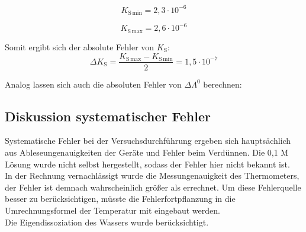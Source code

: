 \documentclass[12pt,a4paper,titlepage,headinclude,bibtotoc]{scrartcl}
\begin{document}
\begin{equation}
K_{\mathrm{S}\,\mathrm{min}} = 2,3 \cdot 10^{-6}
\end{equation}

\begin{equation}
K_{\mathrm{S}\,\mathrm{max}} = 2,6 \cdot 10^{-6}
\end{equation}


Somit ergibt sich der absolute Fehler von $K_{\mathrm{S}}$:\\

\begin{equation}
\Delta K_{\mathrm{S}} = \frac{K_{\mathrm{S}\,\mathrm{max}} - K_{\mathrm{S}\,\mathrm{min}}}{2} = 1,5 \cdot 10^{-7}
\end{equation}


Analog lassen sich auch die absoluten Fehler von $\Delta \Lambda^0$ berechnen:\\





\subsection{Diskussion systematischer Fehler}

Systematische Fehler bei der Versuchsdurchführung ergeben sich hauptsächlich aus Ableseungenauigkeiten der Geräte und Fehler beim Verdünnen. Die 0,1 M Lösung wurde nicht selbst hergestellt, sodass der Fehler hier nicht bekannt ist.\\

In der Rechnung vernachlässigt wurde die Messungenauigkeit des Thermometers, der Fehler ist demnach wahrscheinlich größer als errechnet. Um diese Fehlerquelle besser zu berücksichtigen, müsste die Fehlerfortpflanzung in die Umrechnungsformel der Temperatur mit eingebaut werden.\\

Die Eigendissoziation des Wassers wurde berücksichtigt.\\
\end{document}
